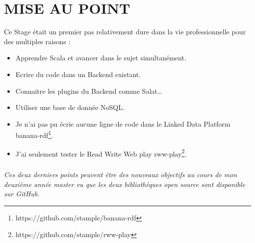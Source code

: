 \chapter{MISE AU POINT}

Ce Stage était un premier pas relativement dure dans la vie professionnelle pour des multiples raisons :
\begin{itemize}
\item Apprendre Scala et avancer dans le sujet simultanément.

\item Ecrire du code dans un Backend existant.

\item Connaitre les plugins du Backend comme Salat…

\item Utiliser une base de donnée NoSQL.

\item Je n'ai pas pu écrie aucune ligne de code dans le Linked Data Platform banana-rdf\footnote{https://github.com/stample/banana-rdf}.

\item J'ai seulement tester le Read Write Web play rww-play\footnote{https://github.com/stample/rww-play}.


\end{itemize}
\paragraph{}
\textit{
Ces deux derniers points peuvent être des nouveaux objectifs au cours de mon deuxième année master vu que les deux bibliothèques open source sont disponible sur GitHub.}  
